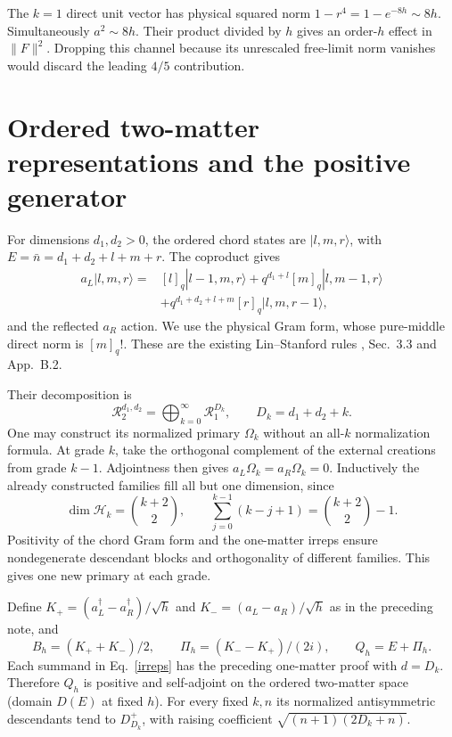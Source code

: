 \documentclass[11pt,a4paper]{article}
\newcommand{\ket}[1]{|#1\rangle}
\newcommand{\norm}[1]{\lVert#1\rVert}
\begin{document}
The $k=1$ direct unit vector has physical squared norm
$1-r^4=1-e^{-8h}\sim8h$. Simultaneously $a^2\sim8h$.
Their product divided by $h$ gives an order-$h$ effect in $\norm F^2$.
Dropping this channel because its unrescaled free-limit norm vanishes
would discard the leading $4/5$ contribution.

\newpage
\section{Ordered two-matter representations and the positive generator}
For dimensions $d_1,d_2>0$, the ordered chord states are
$\ket{l,m,r}$, with $E=\bar n=d_1+d_2+l+m+r$. The coproduct gives
\begin{align}
 a_L\ket{l,m,r}={}&[l]_q\ket{l-1,m,r}
 +q^{d_1+l}[m]_q\ket{l,m-1,r}\nonumber\\
 &+q^{d_1+d_2+l+m}[r]_q\ket{l,m,r-1},\label{action}
\end{align}
and the reflected $a_R$ action. We use the physical Gram form, whose
pure-middle direct norm is $[m]_q!$. These are the existing
Lin--Stanford rules \cite{LS}, Sec.~3.3 and App.~B.2.

Their decomposition is
\begin{equation}
 \mathcal R_{2}^{d_1,d_2}=\bigoplus_{k=0}^\infty\mathcal R_1^{D_k},
 \qquad D_k=d_1+d_2+k.\label{irreps}
\end{equation}
One may construct its normalized primary $\Omega_k$ without an
all-$k$ normalization formula. At grade $k$, take the orthogonal
complement of the external creations from grade $k-1$. Adjointness
then gives $a_L\Omega_k=a_R\Omega_k=0$. Inductively the already
constructed families fill all but one dimension, since
\begin{equation}
 \dim\mathcal H_k=\binom{k+2}{2},\qquad
 \sum_{j=0}^{k-1}(k-j+1)=\binom{k+2}{2}-1.
\end{equation}
Positivity of the chord Gram form and the one-matter irreps ensure
nondegenerate descendant blocks and orthogonality of different
families. This gives one new primary at each grade.

Define $K_+=(a_L^\dagger-a_R^\dagger)/\sqrt h$ and
$K_-=(a_L-a_R)/\sqrt h$ as in the preceding note, and
\begin{equation}
 B_h=(K_++K_-)/2,\qquad \Pi_h=(K_--K_+)/(2i),\qquad Q_h=E+\Pi_h.
\end{equation}
Each summand in Eq.~\eqref{irreps} has the preceding one-matter
proof with $d=D_k$. Therefore $Q_h$ is positive and self-adjoint
on the ordered two-matter space (domain $D(E)$ at fixed $h$).
For every fixed $k,n$ its normalized antisymmetric descendants tend
to $D^+_{D_k}$, with raising coefficient
$\sqrt{(n+1)(2D_k+n)}$.
\end{document}
